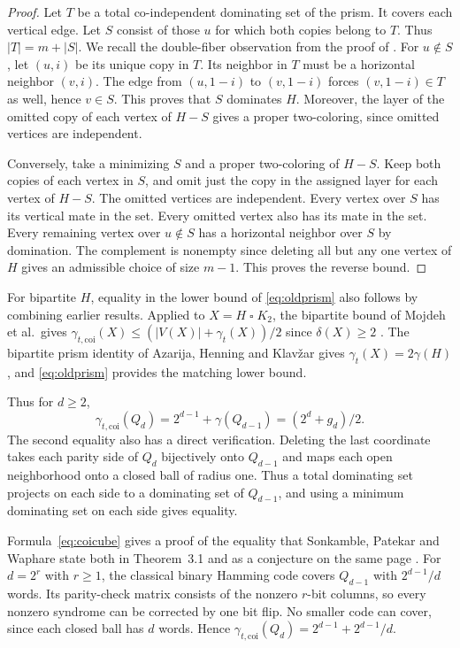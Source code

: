 \documentclass[11pt,a4paper]{article}
\newcommand{\coi}{\gamma_{t,\mathrm{coi}}}
\newcommand{\boxprod}{\mathbin{\square}}
\begin{document}
\begin{proof}
Let $T$ be a total co-independent dominating set of the prism. It covers
each vertical edge. Let $S$ consist of those $u$ for which both copies
belong to $T$. Thus $|T|=m+|S|$. We recall the double-fiber observation
from the proof of \cite[Theorem 5.1]{italian}. For $u\notin S$, let
$(u,i)$ be its unique copy in $T$. Its neighbor in $T$ must be a
horizontal neighbor $(v,i)$. The edge from $(u,1-i)$ to $(v,1-i)$
forces $(v,1-i)\in T$ as well, hence $v\in S$. This proves that $S$
dominates $H$. Moreover, the layer of the omitted copy of each vertex
of $H-S$ gives a proper two-coloring, since omitted vertices are
independent.

Conversely, take a minimizing $S$ and a proper two-coloring of $H-S$.
Keep both copies of each vertex in $S$, and omit just the copy in
the assigned layer for each vertex of $H-S$. The omitted vertices
are independent. Every vertex over $S$ has its vertical mate in the set.
Every omitted vertex also has its mate in the set. Every remaining vertex
over $u\notin S$ has a horizontal neighbor over $S$ by domination.
The complement is nonempty since deleting all but any one vertex of $H$
gives an admissible choice of size $m-1$. This proves the reverse bound.
\end{proof}

For bipartite $H$, equality in the lower bound of \eqref{eq:oldprism}
also follows by combining earlier results. Applied to
$X=H\boxprod K_2$, the bipartite bound of Mojdeh et al.\ gives
$\coi(X)\le (|V(X)|+\gamma_t(X))/2$ since $\delta(X)\ge2$
\cite[Theorem 4.10 in the preprint]{mojdeh}. The bipartite prism
identity of Azarija, Henning and Klav\v{z}ar gives
$\gamma_t(X)=2\gamma(H)$ \cite{prisms}, and \eqref{eq:oldprism}
provides the matching lower bound.

Thus for $d\ge2$,
\begin{equation}\label{eq:coicube}
  \coi(Q_d)=2^{d-1}+\gamma(Q_{d-1})=(2^d+g_d)/2.
\end{equation}
The second equality also has a direct verification. Deleting the last
coordinate takes each
parity side of $Q_d$ bijectively onto $Q_{d-1}$ and maps each open
neighborhood onto a closed ball of radius one. Thus a total dominating
set projects on each side to a dominating set of $Q_{d-1}$, and using a
minimum dominating set on each side gives equality.

Formula~\eqref{eq:coicube} gives a proof of the equality that Sonkamble,
Patekar and Waphare state both in Theorem~3.1 and as a conjecture on the
same page \cite[p.~460]{sonkamble}. For $d=2^r$ with $r\ge1$, the classical binary
Hamming code covers $Q_{d-1}$ with $2^{d-1}/d$ words. Its parity-check
matrix consists of the nonzero $r$-bit columns, so every nonzero syndrome
can be corrected by one bit flip. No smaller code can cover, since each
closed ball has $d$ words. Hence $\coi(Q_d)=2^{d-1}+2^{d-1}/d$.
\end{document}
